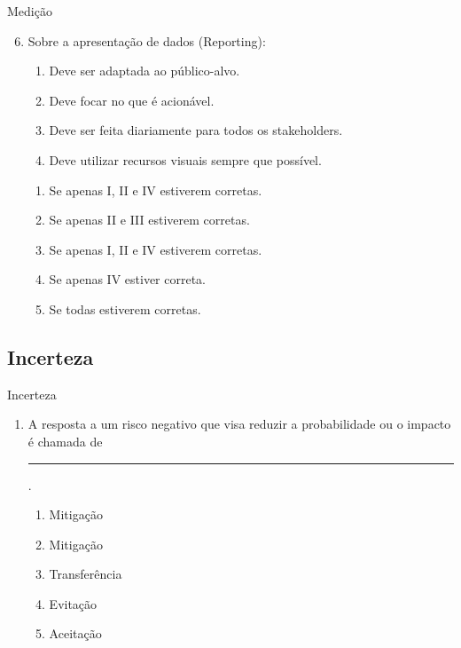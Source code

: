\documentclass{beamer}
\begin{document}
\begin{frame}{Medição}
	\begin{enumerate}
		\setcounter{enumi}{5}
		\justifying
		\item Sobre a apresentação de dados (Reporting):
		\begin{enumerate}[I]
			\item Deve ser adaptada ao público-alvo.
			\item Deve focar no que é acionável.
			\item Deve ser feita diariamente para todos os stakeholders.
			\item Deve utilizar recursos visuais sempre que possível.
		\end{enumerate}
		\begin{enumerate}[a]
			\item Se apenas I, II e IV estiverem corretas.
			\item Se apenas II e III estiverem corretas.
			\item \alert<2>{Se apenas I, II e IV estiverem corretas.}
			\item Se apenas IV estiver correta.
			\item Se todas estiverem corretas.
		\end{enumerate}
	\end{enumerate}
\end{frame}

\subsection{Incerteza}

\begin{frame}{Incerteza}
	\begin{enumerate}
		\justifying
		\item A resposta a um risco negativo que visa reduzir a probabilidade ou o impacto é chamada de \rule{60pt}{1pt}.
		\begin{enumerate}[a]
			\item Mitigação
			\item \alert<2>{Mitigação}
			\item Transferência
			\item Evitação
			\item Aceitação
		\end{enumerate}
	\end{enumerate}
\end{frame}
\end{document}
